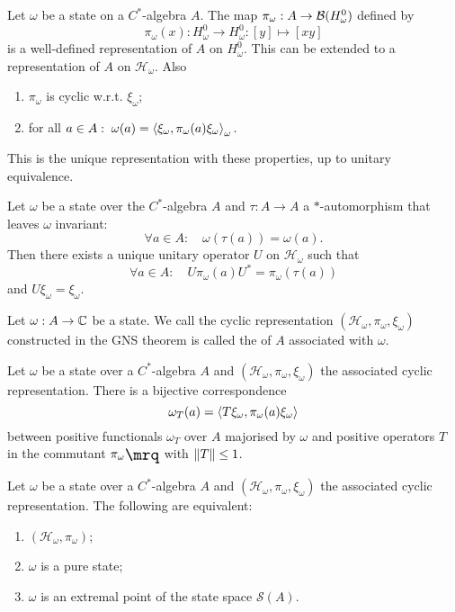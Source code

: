 \begin{theorem}
Let $\omega$ be a state on a $C^*$-algebra $A$. The map $\pi_\omega: A\to \operatorname{\mathcal{B}}(H^0_\omega)$ defined by
\[ \pi_\omega(x) : H^0_\omega \to H^0_\omega: [y] \mapsto [xy] \]
is a well-defined representation of $A$ on $H^0_\omega$. This can be extended to a representation of $A$ on $\mathcal{H}_\omega$. Also
\begin{enumerate}
\item $\pi_\omega$ is cyclic w.r.t. $\xi_\omega$;
\item for all $a\in A:\; \omega(a) = \left\langle \xi_\omega, \pi_\omega(a)\xi_\omega \right\rangle_\omega.$
\end{enumerate}
This is the unique representation with these properties, up to unitary equivalence.
\end{theorem}
\begin{corollary}
Let $\omega$ be a state over the $C^*$-algebra $A$ and $\tau: A\to A$ a $*$-automorphism that leaves $\omega$ invariant:
\[ \forall a\in A: \quad \omega(\tau(a)) = \omega(a). \]
Then there exists a unique unitary operator $U$ on $\mathcal{H}_\omega$ such that
\[ \forall a\in A: \quad U\pi_\omega(a)U^* = \pi_\omega(\tau(a)) \]
and $U\xi_\omega = \xi_\omega$.
\end{corollary}

\begin{definition}
Let $\omega: A\to \mathbb{C}$ be a state.
We call the cyclic representation $(\mathcal{H}_\omega,\pi_\omega,\xi_\omega)$ constructed in the GNS theorem is called the  of $A$ associated with $\omega$.
\end{definition}

\begin{lemma}
Let $\omega$ be a state over a $C^*$-algebra $A$ and $(\mathcal{H}_\omega,\pi_\omega,\xi_\omega)$ the associated cyclic representation. There is a bijective correspondence 
\[ \omega_T(a) = \left\langle T\xi_\omega, \pi_\omega(a)\xi_\omega \right\rangle \]
between positive functionals $\omega_T$ over $A$ majorised by $\omega$ and positive operators $T$ in the commutant $\comm{\pi_\omega}$ with $\lVert T\rVert\leq 1$.
\end{lemma}

\begin{proposition}
Let $\omega$ be a state over a $C^*$-algebra $A$ and $(\mathcal{H}_\omega,\pi_\omega,\xi_\omega)$ the associated cyclic representation. The following are equivalent:
\begin{enumerate}
\item $(\mathcal{H}_\omega,\pi_\omega)$;
\item $\omega$ is a pure state;
\item $\omega$ is an extremal point of the state space $\mathcal{S}(A)$.
\end{enumerate}
\end{proposition}

